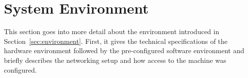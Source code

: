 \section{System Environment}
\label{sec:sys-environment}

This section goes into more detail about the environment introduced in
Section~\ref{sec:environment}. First, it gives the technical
specifications of the hardware environment followed by the
pre-configured software environment and briefly describes the networking
setup and how access to the machine was configured.



